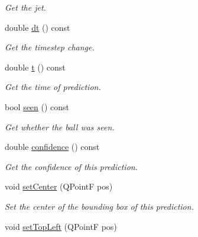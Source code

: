 \begin{DoxyCompactItemize}
\begin{DoxyCompactList}\small\item\em Get the jet. \end{DoxyCompactList}\item 
double \hyperlink{classKFPrediction_a60679b464a34bfad1c5d4875fd172357}{dt} () const \hypertarget{classKFPrediction_a60679b464a34bfad1c5d4875fd172357}{}\label{classKFPrediction_a60679b464a34bfad1c5d4875fd172357}

\begin{DoxyCompactList}\small\item\em Get the timestep change. \end{DoxyCompactList}\item 
double \hyperlink{classKFPrediction_a2580cd73915b169edf669c8cb2271d35}{t} () const \hypertarget{classKFPrediction_a2580cd73915b169edf669c8cb2271d35}{}\label{classKFPrediction_a2580cd73915b169edf669c8cb2271d35}

\begin{DoxyCompactList}\small\item\em Get the time of prediction. \end{DoxyCompactList}\item 
bool \hyperlink{classKFPrediction_af19dba9fa007ce21c0e36e4e96c3cb54}{seen} () const \hypertarget{classKFPrediction_af19dba9fa007ce21c0e36e4e96c3cb54}{}\label{classKFPrediction_af19dba9fa007ce21c0e36e4e96c3cb54}

\begin{DoxyCompactList}\small\item\em Get whether the ball was seen. \end{DoxyCompactList}\item 
double \hyperlink{classKFPrediction_a7bfaf85aebf53e164f222c41d55d231d}{confidence} () const \hypertarget{classKFPrediction_a7bfaf85aebf53e164f222c41d55d231d}{}\label{classKFPrediction_a7bfaf85aebf53e164f222c41d55d231d}

\begin{DoxyCompactList}\small\item\em Get the confidence of this prediction. \end{DoxyCompactList}\item 
void \hyperlink{classKFPrediction_abc4a59c2df74e58c988528e771b9fd17}{set\+Center} (Q\+PointF pos)\hypertarget{classKFPrediction_abc4a59c2df74e58c988528e771b9fd17}{}\label{classKFPrediction_abc4a59c2df74e58c988528e771b9fd17}

\begin{DoxyCompactList}\small\item\em Set the center of the bounding box of this prediction. \end{DoxyCompactList}\item 
void \hyperlink{classKFPrediction_aa9618a3405100db29a22da58277d2b7e}{set\+Top\+Left} (Q\+PointF pos)\hypertarget{classKFPrediction_aa9618a3405100db29a22da58277d2b7e}{}\label{classKFPrediction_aa9618a3405100db29a22da58277d2b7e}


\end{DoxyCompactItemize}
